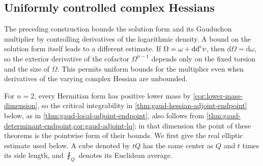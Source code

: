\subsection{Uniformly controlled complex Hessians}
\label{sec:gaud-hessian-adjoint-bounds}

The preceding construction bounds the solution form and its Gauduchon multiplier by controlling derivatives of the logarithmic density. A bound on the solution form itself leads to a different estimate. If $\Omega=\omega+\mathrm{dd}^{\mathrm{c}} v$, then $\mathrm d\Omega=\mathrm d\omega$, so the exterior derivative of the cofactor $\Omega^{n-1}$ depends only on the fixed torsion and the size of $\Omega$. This permits uniform bounds for the multiplier even when derivatives of the varying complex Hessian are unbounded.

For $n=2$, every Hermitian form has positive lower mass by \cref{cor:lower-mass-dimension}, so the critical integrability in \cref{thm:gaud-hessian-adjoint-endpoint} below, as in \cref{thm:gaud-local-adjoint-endpoint}, also follows from \cref{thm:gaud-determinant-endpoint,cor:gaud-adjoint-lq}; in that dimension the point of these theorems is the pointwise form of their bounds. We first give the real elliptic estimate used below. A cube denoted by $tQ$ has the same center as $Q$ and $t$ times its side length, and $\fint_Q$ denotes its Euclidean average.

